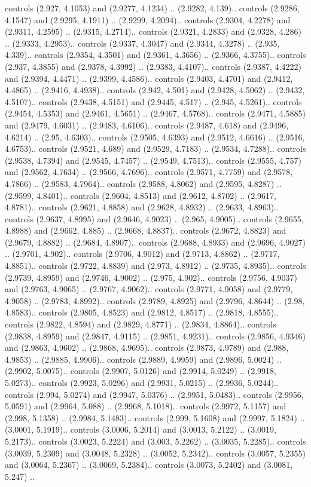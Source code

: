controls (2.927, 4.1053) and (2.9277, 4.1234) .. (2.9282, 4.139).. controls (2.9286, 4.1547) and (2.9295, 4.1911) .. (2.9299, 4.2094).. controls (2.9304, 4.2278) and (2.9311, 4.2595) .. (2.9315, 4.2714).. controls (2.9321, 4.2833) and (2.9328, 4.286) .. (2.9333, 4.2953).. controls (2.9337, 4.3047) and (2.9344, 4.3278) .. (2.935, 4.339).. controls (2.9354, 4.3501) and (2.9361, 4.3656) .. (2.9366, 4.3755).. controls (2.937, 4.3855) and (2.9378, 4.3992) .. (2.9383, 4.4107).. controls (2.9387, 4.4222) and (2.9394, 4.4471) .. (2.9399, 4.4586).. controls (2.9403, 4.4701) and (2.9412, 4.4865) .. (2.9416, 4.4938).. controls (2.942, 4.501) and (2.9428, 4.5062) .. (2.9432, 4.5107).. controls (2.9438, 4.5151) and (2.9445, 4.517) .. (2.945, 4.5261).. controls (2.9454, 4.5353) and (2.9461, 4.5651) .. (2.9467, 4.5768).. controls (2.9471, 4.5885) and (2.9479, 4.6031) .. (2.9483, 4.6106).. controls (2.9487, 4.618) and (2.9496, 4.6214) .. (2.95, 4.6303).. controls (2.9505, 4.6393) and (2.9512, 4.6616) .. (2.9516, 4.6753).. controls (2.9521, 4.689) and (2.9529, 4.7183) .. (2.9534, 4.7288).. controls (2.9538, 4.7394) and (2.9545, 4.7457) .. (2.9549, 4.7513).. controls (2.9555, 4.757) and (2.9562, 4.7634) .. (2.9566, 4.7696).. controls (2.9571, 4.7759) and (2.9578, 4.7866) .. (2.9583, 4.7964).. controls (2.9588, 4.8062) and (2.9595, 4.8287) .. (2.9599, 4.8401).. controls (2.9604, 4.8513) and (2.9612, 4.8702) .. (2.9617, 4.8781).. controls (2.9621, 4.8858) and (2.9628, 4.8932) .. (2.9633, 4.8963).. controls (2.9637, 4.8995) and (2.9646, 4.9023) .. (2.965, 4.9005).. controls (2.9655, 4.8988) and (2.9662, 4.885) .. (2.9668, 4.8837).. controls (2.9672, 4.8823) and (2.9679, 4.8882) .. (2.9684, 4.8907).. controls (2.9688, 4.8933) and (2.9696, 4.9027) .. (2.9701, 4.902).. controls (2.9706, 4.9012) and (2.9713, 4.8862) .. (2.9717, 4.8851).. controls (2.9722, 4.8839) and (2.973, 4.8912) .. (2.9735, 4.8935).. controls (2.9739, 4.8959) and (2.9746, 4.9002) .. (2.975, 4.902).. controls (2.9756, 4.9037) and (2.9763, 4.9065) .. (2.9767, 4.9062).. controls (2.9771, 4.9058) and (2.9779, 4.9058) .. (2.9783, 4.8992).. controls (2.9789, 4.8925) and (2.9796, 4.8644) .. (2.98, 4.8583).. controls (2.9805, 4.8523) and (2.9812, 4.8517) .. (2.9818, 4.8555).. controls (2.9822, 4.8594) and (2.9829, 4.8771) .. (2.9834, 4.8864).. controls (2.9838, 4.8959) and (2.9847, 4.9115) .. (2.9851, 4.9231).. controls (2.9856, 4.9346) and (2.9863, 4.9602) .. (2.9868, 4.9695).. controls (2.9873, 4.9789) and (2.988, 4.9853) .. (2.9885, 4.9906).. controls (2.9889, 4.9959) and (2.9896, 5.0024) .. (2.9902, 5.0075).. controls (2.9907, 5.0126) and (2.9914, 5.0249) .. (2.9918, 5.0273).. controls (2.9923, 5.0296) and (2.9931, 5.0215) .. (2.9936, 5.0244).. controls (2.994, 5.0274) and (2.9947, 5.0376) .. (2.9951, 5.0483).. controls (2.9956, 5.0591) and (2.9964, 5.088) .. (2.9968, 5.1018).. controls (2.9972, 5.1157) and (2.998, 5.1358) .. (2.9984, 5.1483).. controls (2.999, 5.1608) and (2.9997, 5.1824) .. (3.0001, 5.1919).. controls (3.0006, 5.2014) and (3.0013, 5.2122) .. (3.0019, 5.2173).. controls (3.0023, 5.2224) and (3.003, 5.2262) .. (3.0035, 5.2285).. controls (3.0039, 5.2309) and (3.0048, 5.2328) .. (3.0052, 5.2342).. controls (3.0057, 5.2355) and (3.0064, 5.2367) .. (3.0069, 5.2384).. controls (3.0073, 5.2402) and (3.0081, 5.247) .. 